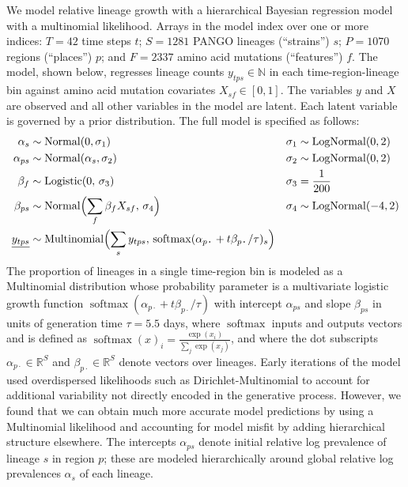 \documentclass[12pt]{article}
\newcommand \blank {{\,\pmb\cdot\,}}
\begin{document}
We model relative lineage growth with a hierarchical Bayesian regression model with a multinomial likelihood.
Arrays in the model index over one or more indices: $T{=}42$ time steps $t$; $S{=}1281$ PANGO lineages (``strains'') $s$; $P{=}1070$ regions (``places'') $p$; and $F{=}2337$ amino acid mutations (``features'') $f$.
The model, shown below, regresses lineage counts $y_{tps}\in\mathbb N$ in each time-region-lineage bin against amino acid mutation covariates $X_{sf} \in [0,1]$.
The variables $y$ and $X$ are observed and all other variables in the model are latent. Each latent variable is governed by a prior distribution.
The full model is specified as follows:
\begin{align*}
  \textstyle
  \alpha_s &\sim \operatorname{Normal}(0, \sigma_1) &
  \sigma_1 &\sim \operatorname{LogNormal}(0, 2) \\
  \alpha_{ps} &\sim \operatorname{Normal}(\alpha_s, \sigma_2) &
  \sigma_2 &\sim \operatorname{LogNormal}(0, 2) \\
  \beta_f &\sim \operatorname{Logistic}(0,\, \sigma_3) &
  \sigma_3 &= \frac{1}{200} \\
  \beta_{ps} &\sim \operatorname{Normal}\Bigl(
   \sum_f \beta_f X_{sf},\, \sigma_4
  \Bigr) &
  \sigma_4 &\sim \operatorname{LogNormal}(-4, 2) \\
  \underline{y_{tps}} &\sim \operatorname{Multinomial}\Bigl(
    \sum_s y_{tps},\, \operatorname{softmax}(\alpha_{p\blank} + t\beta_{p\blank}/\tau)_s
  \Bigr)
\end{align*}
The proportion of lineages in a single time-region bin is modeled as a Multinomial distribution whose probability parameter is a multivariate logistic growth function $\operatorname{softmax}(\alpha_{p\blank} + t\beta_{p\blank}/\tau)$ with intercept $\alpha_{ps}$ and slope $\beta_{ps}$ in units of generation time $\tau=5.5$ days, where $\operatorname{softmax}$ inputs and outputs vectors and is defined as
${
  \operatorname{softmax}(x)_i = \frac {\exp(x_i)} {\sum_j \exp(x_j)}
}$, and where the dot subscripts $\alpha_{p\blank}\in\mathbb R^S$ and $\beta_{p\blank}\in\mathbb R^S$ denote vectors over lineages.
Early iterations of the model used overdispersed likelihoods such as Dirichlet-Multinomial to account for additional variability not directly encoded in the generative process.
However, we found that we can obtain much more accurate model predictions by using a Multinomial likelihood and accounting for model misfit by adding hierarchical structure elsewhere.
The intercepts $\alpha_{ps}$ denote initial relative log prevalence of lineage $s$ in region $p$; these are modeled hierarchically around global relative log prevalences $\alpha_s$ of each lineage.
\end{document}

